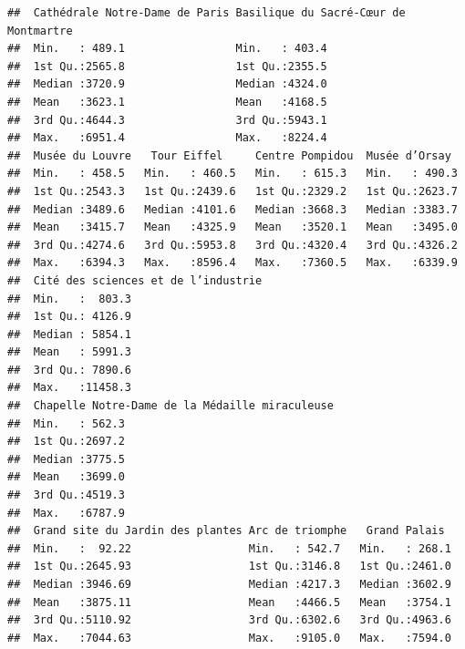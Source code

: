 \documentclass[french,]{article}
\begin{document}
\begin{verbatim}
##  Cathédrale Notre-Dame de Paris Basilique du Sacré-Cœur de Montmartre
##  Min.   : 489.1                 Min.   : 403.4                       
##  1st Qu.:2565.8                 1st Qu.:2355.5                       
##  Median :3720.9                 Median :4324.0                       
##  Mean   :3623.1                 Mean   :4168.5                       
##  3rd Qu.:4644.3                 3rd Qu.:5943.1                       
##  Max.   :6951.4                 Max.   :8224.4                       
##  Musée du Louvre   Tour Eiffel     Centre Pompidou  Musée d’Orsay   
##  Min.   : 458.5   Min.   : 460.5   Min.   : 615.3   Min.   : 490.3  
##  1st Qu.:2543.3   1st Qu.:2439.6   1st Qu.:2329.2   1st Qu.:2623.7  
##  Median :3489.6   Median :4101.6   Median :3668.3   Median :3383.7  
##  Mean   :3415.7   Mean   :4325.9   Mean   :3520.1   Mean   :3495.0  
##  3rd Qu.:4274.6   3rd Qu.:5953.8   3rd Qu.:4320.4   3rd Qu.:4326.2  
##  Max.   :6394.3   Max.   :8596.4   Max.   :7360.5   Max.   :6339.9  
##  Cité des sciences et de l’industrie
##  Min.   :  803.3                    
##  1st Qu.: 4126.9                    
##  Median : 5854.1                    
##  Mean   : 5991.3                    
##  3rd Qu.: 7890.6                    
##  Max.   :11458.3                    
##  Chapelle Notre-Dame de la Médaille miraculeuse
##  Min.   : 562.3                                
##  1st Qu.:2697.2                                
##  Median :3775.5                                
##  Mean   :3699.0                                
##  3rd Qu.:4519.3                                
##  Max.   :6787.9                                
##  Grand site du Jardin des plantes Arc de triomphe   Grand Palais   
##  Min.   :  92.22                  Min.   : 542.7   Min.   : 268.1  
##  1st Qu.:2645.93                  1st Qu.:3146.8   1st Qu.:2461.0  
##  Median :3946.69                  Median :4217.3   Median :3602.9  
##  Mean   :3875.11                  Mean   :4466.5   Mean   :3754.1  
##  3rd Qu.:5110.92                  3rd Qu.:6302.6   3rd Qu.:4963.6  
##  Max.   :7044.63                  Max.   :9105.0   Max.   :7594.0
\end{verbatim}
\end{document}
